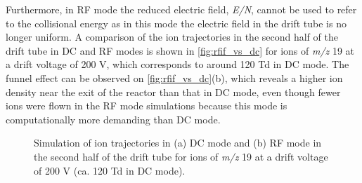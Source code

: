 Furthermore, in RF mode the reduced electric field, \textit{E/N}, cannot be used to refer to the collisional energy as in this mode the electric field  in the drift tube is no longer uniform. A comparison of the ion trajectories  in the second half of the drift tube in DC and RF modes is shown in \autoref{fig:rfif_vs_dc} for ions of \textit{m/z} 19 at a drift voltage of 200 V, which corresponds to around 120 Td in DC mode. The funnel effect can be observed on \autoref{fig:rfif_vs_dc}(b), which reveals a higher ion density near the exit of the reactor than that in DC mode, even though fewer ions were flown in the RF mode simulations %
because this mode is computationally more demanding than DC mode.
%
\begin{figure}[t]
\centering
{}
\caption{Simulation of ion trajectories in (a) DC mode and (b) RF mode in the second half of the drift tube for ions of \textit{m/z} 19 at a drift voltage of 200 V (ca. 120 Td in DC mode).}
\label{fig:rfif_vs_dc}
\end{figure}


